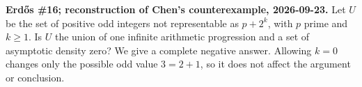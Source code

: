 \textbf{Erd\H{o}s \#16; reconstruction of Chen's counterexample, 2026-09-23.}
Let $U$ be the set of positive odd integers not representable as $p+2^k$, with $p$ prime and $k\ge1$. Is $U$ the union of one infinite arithmetic progression and a set of asymptotic density zero? We give a complete negative answer. Allowing $k=0$ changes only the possible odd value $3=2+1$, so it does not affect the argument or conclusion.

